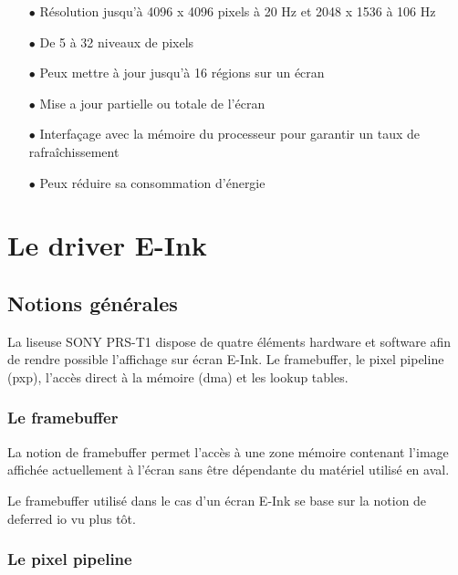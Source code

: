 \begin{itemize}
	\item[$\bullet$] Résolution jusqu'à 4096 x 4096 pixels à 20 Hz et 2048 x 1536 à 106 Hz
	\item[$\bullet$] De 5 à 32 niveaux de pixels
	\item[$\bullet$] Peux mettre à jour jusqu'à 16 régions sur un écran
	\item[$\bullet$] Mise a jour partielle ou totale de l'écran 
	\item[$\bullet$] Interfaçage avec la mémoire du processeur pour garantir un taux de rafraîchissement
	\item[$\bullet$] Peux réduire sa consommation d'énergie
\end{itemize}


\section{Le driver E-Ink}

\subsection{Notions générales}
La liseuse SONY PRS-T1 dispose de quatre éléments hardware et software afin 
de rendre possible l'affichage sur écran E-Ink. Le framebuffer, le pixel pipeline (pxp), l'accès direct à la mémoire (dma) et les lookup tables.

\subsubsection{Le framebuffer}

La notion de framebuffer permet l'accès à une zone mémoire contenant l'image affichée actuellement à l'écran sans être dépendante du matériel utilisé en aval.

Le framebuffer utilisé dans le cas d'un écran E-Ink se base sur la notion de deferred io vu plus tôt.

\subsubsection{Le pixel pipeline}

